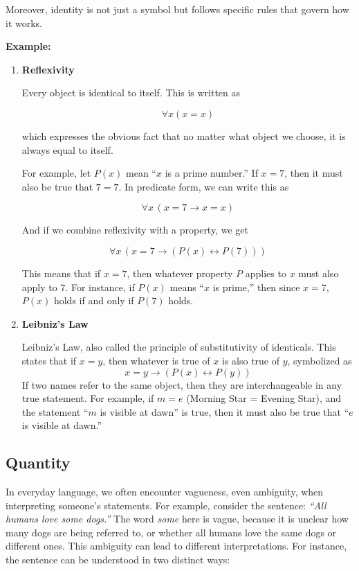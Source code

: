 \documentclass[12pt,a4paper,openany]{article}
\begin{document}
Moreover, identity is not just a symbol but follows specific rules that
govern how it works.

\textbf{Example:}

\begin{enumerate}
\item
\textbf{Reflexivity}

Every object is identical to itself. This is written as

\[\forall x (x = x)\]

which expresses the obvious fact that no matter what object we choose,
it is always equal to itself.

For example, let \(P(x)\) mean ``\(x\) is a prime number.'' If
\(x = 7\), then it must also be true that \(7 = 7\). In predicate
form, we can write this as

\[\forall x \, (x = 7 \to x = x)\]

And if we combine reflexivity with a property, we get

\[\forall x \, (x = 7 \to (P(x) \leftrightarrow P(7)))\]

This means that if \(x = 7\), then whatever property \(P\) applies to
\(x\) must also apply to \(7\). For instance, if \(P(x)\) means
``\(x\) is prime,'' then since \(x = 7\), \(P(x)\) holds if and only
if \(P(7)\) holds.
\item
\textbf{Leibniz's Law}

Leibniz's Law, also called the principle of substitutivity of identicals. This states that if \(x = y\), then
whatever is true of \(x\) is also true of \(y\), symbolized as
\[x = y \to (P(x) \leftrightarrow P(y))\] If two names refer
to the same object, then they are interchangeable in any true
statement. For example, if \(m = e\) (Morning Star = Evening Star),
and the statement ``\(m\) is visible at dawn'' is true, then it must
also be true that ``\(e\) is visible at dawn.''
\end{enumerate}

\subsection{Quantity}
\label{quantity}

In everyday language, we often encounter vagueness, even ambiguity, when
interpreting someone's statements. For example, consider the sentence:
\emph{``All humans love some dogs.''} The word \emph{some} here is
vague, because it is unclear how many dogs are being referred to, or
whether all humans love the same dogs or different ones. This ambiguity
can lead to different interpretations. For instance, the sentence can be
understood in two distinct ways:
\end{document}

